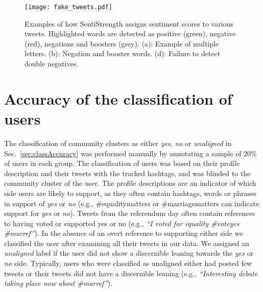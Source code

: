 \documentclass{article}
\begin{document}
\begin{figure}[tp]
  \centerline{\texttt{[image: fake\_tweets.pdf]}}
  \caption{Examples of how SentiStrength assigns sentiment scores to
    various tweets. Highlighted words are detected as positive
    (green), negative (red), negations and boosters (grey). (a): Example
    of multiple letters. (b): Negation and booster words. (d): Failure to
    detect double negatives.}
  \label{fig:SenExample}
\end{figure}

\section{Accuracy of the classification of users}
\label{app:accuracy}

The classification of community clusters as either \textit{yes},
\textit{no} or \textit{unaligned} in Sec.~\ref{sec:classAccuracy} was
performed manually by annotating a sample of $20\%$ of users in each
group. The classification of users was based on their profile
description and their tweets with the tracked hashtags, and was
blinded to the community cluster of the user. The profile descriptions
are an indicator of which side users are likely to support, as they
often contain hashtags, words or phrases in support of {\it yes} or
{\it no} (e.g., \#equalitymatters or \#marriagematters can indicate
support for {\it yes} or {\it no}). Tweets from the referendum day
often contain references to having voted or supported yes or no (e.g.,
{\it ``I voted for equality \#voteyes \#marref''}). In the absence of
an overt reference to supporting either side we classified the user
after examining all their tweets in our data. We assigned an {\it
  unaligned} label if the user did not show a discernible leaning
towards the {\it yes} or {\it no} side. Typically, users who were
classified as unaligned either had posted few tweets or their tweets
did not have a discernible leaning (e.g., {\it ``Interesting debate
  taking place now about \#marref''}).
\end{document}
